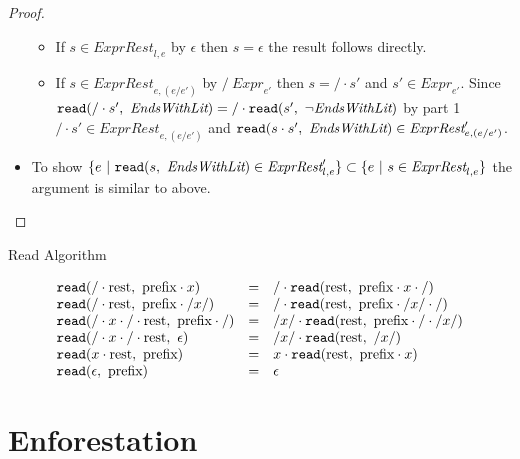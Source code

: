 \documentclass[preprint,10pt]{sigplanconf}
\begin{document}
\begin{proof}
\begin{itemize}
\begin{itemize}
  \item If \( s \in \textit{ExprRest}_{l, e} \) by \( \epsilon \) then
    \( s = \epsilon \) the result follows directly.
    
  \item If \( s \in \textit{ExprRest}_{e, (e / e')} \) by 
    \( /~\textit{Expr}_{e'} \) then \( s = / \cdot s' \) and 
    \( s' \in \textit{Expr}_{e'} \). Since 
    \( \texttt{read}(/ \cdot s',~\textit{EndsWithLit}) = /\cdot \texttt{read}(s',~\neg \textit{EndsWithLit}) \)
    by part 1 \( / \cdot s' \in \textit{ExprRest}_{e, (e / e')} \)
    and \( \texttt{read}(s \cdot s',~\textit{EndsWithLit}) \in \textit{ExprRest}'_{e, (e / e')} \).
  \end{itemize}

\item To show
  \( 
  \{ e ~|~ \texttt{read}(s,~\textit{EndsWithLit}) \in \textit{ExprRest}'_{l,e}
  \}
  \subset  
  \{ e ~|~ s \in \textit{ExprRest}_{l, e} \} 
  \) the argument is similar to above.
  \end{itemize}

\end{proof}

\begin{displayfigure*}{\label{fig:read}Read Algorithm}
  
\[
  \begin{array}{lcl}
    \texttt{read}(/\cdot \textrm{rest},~\textrm{prefix}\cdot x)
    &=&
    / \cdot 
      \texttt{read}(\textrm{rest},~
        \textrm{prefix}\cdot x\cdot /
      )
   
    \\
    \texttt{read}(/\cdot \textrm{rest},~\textrm{prefix}\cdot /x/)
    &=&
    / \cdot 
      \texttt{read}(\textrm{rest},~
        \textrm{prefix}\cdot /x/ \cdot /
      )
   
    \\
    \texttt{read}(/\cdot x \cdot /\cdot\textrm{rest},~\textrm{prefix}\cdot /)
    &=&
    /x/ \cdot 
      \texttt{read}(\textrm{rest},~
        \textrm{prefix}\cdot / \cdot /x/
      )
   
    \\
    \texttt{read}(/\cdot x \cdot /\cdot\textrm{rest},~\epsilon)
    &=&
    /x/ \cdot 
      \texttt{read}(\textrm{rest},~/x/)
   
    \\
    \texttt{read}(x \cdot \textrm{rest},~\textrm{prefix})
    &=&
    x \cdot 
      \texttt{read}(\textrm{rest},~\textrm{prefix}\cdot x)
   
    \\
    \texttt{read}(\epsilon,~\textrm{prefix})
    &=&
    \epsilon
  \end{array}
\]
\end{displayfigure*}

\section{Enforestation}
\label{sec-4}
\end{document}
